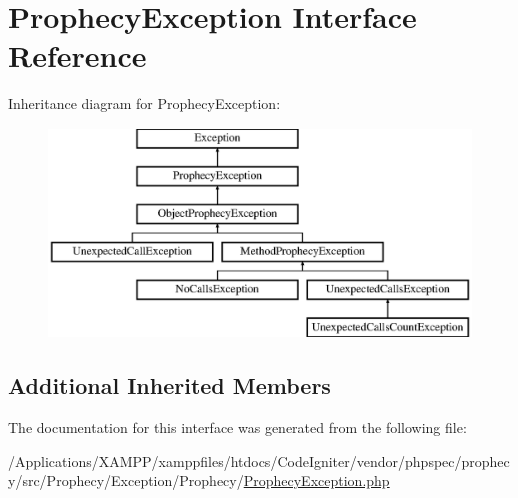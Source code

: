 \hypertarget{interface_prophecy_1_1_exception_1_1_prophecy_1_1_prophecy_exception}{}\section{Prophecy\+Exception Interface Reference}
\label{interface_prophecy_1_1_exception_1_1_prophecy_1_1_prophecy_exception}
Inheritance diagram for Prophecy\+Exception\+:\begin{figure}[H]
\begin{center}
\leavevmode
\includegraphics[height=5.544555cm]{interface_prophecy_1_1_exception_1_1_prophecy_1_1_prophecy_exception}
\end{center}
\end{figure}
\subsection*{Additional Inherited Members}


The documentation for this interface was generated from the following file\+:\begin{DoxyCompactItemize}
\item 
/\+Applications/\+X\+A\+M\+P\+P/xamppfiles/htdocs/\+Code\+Igniter/vendor/phpspec/prophecy/src/\+Prophecy/\+Exception/\+Prophecy/\mbox{\hyperlink{_prophecy_exception_8php}{Prophecy\+Exception.\+php}}\end{DoxyCompactItemize}
